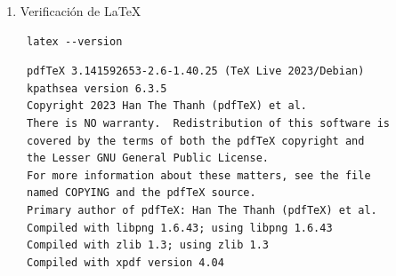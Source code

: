\documentclass[11pt]{article}
\begin{document}
\begin{enumerate}
\begin{verbatim}
GNU Emacs 29.3
Copyright (C) 2024 Free Software Foundation, Inc.
GNU Emacs comes with ABSOLUTELY NO WARRANTY.
You may redistribute copies of GNU Emacs
under the terms of the GNU General Public License.
For more information about these matters, see the file named COPYING.
\end{verbatim}

\item Verificación de \LaTeX{}
\begin{verbatim}
 latex --version
\end{verbatim}

\begin{verbatim}
 pdfTeX 3.141592653-2.6-1.40.25 (TeX Live 2023/Debian)
 kpathsea version 6.3.5
 Copyright 2023 Han The Thanh (pdfTeX) et al.
 There is NO warranty.  Redistribution of this software is
 covered by the terms of both the pdfTeX copyright and
 the Lesser GNU General Public License.
 For more information about these matters, see the file
 named COPYING and the pdfTeX source.
 Primary author of pdfTeX: Han The Thanh (pdfTeX) et al.
 Compiled with libpng 1.6.43; using libpng 1.6.43
 Compiled with zlib 1.3; using zlib 1.3
 Compiled with xpdf version 4.04
\end{verbatim}
\end{enumerate}
\end{document}
